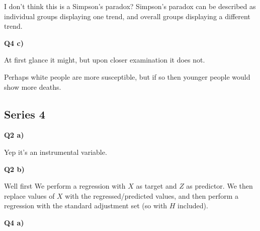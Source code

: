 \documentclass{article}
\begin{document}
			I don't think this is a Simpson's paradox? Simpson's paradox can be described as individual groups displaying one trend, and overall groups displaying a different trend. 
			
		\textbf{Q4 c)}

			At first glance it might, but upon closer examination it does not.
			
			Perhaps white people are more susceptible, but if so then younger people would show more deaths.
			
	\subsection{Series 4}
	
		\textbf{Q2  a)}
			
			Yep it's an instrumental variable.
			
		\textbf{Q2 b)}
			
			Well first We perform a regression with $X$ as target and $Z$ as predictor. We then replace values of $X$ with the regressed/predicted values, and then perform a regression with the standard adjustment set (so with $H$ included).
			
		\textbf{Q4 a)}
		
			
			
			
			
			
			
			
			
			
			
			
\end{document}
